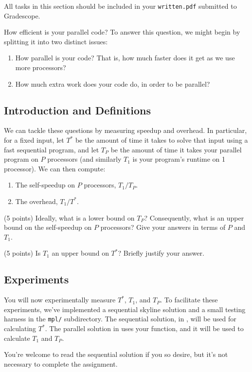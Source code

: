 \begin{note}
All tasks in this section should be included in your \texttt{written.pdf}
submitted to Gradescope.
\end{note}


How efficient is your parallel code? To answer this question, we might begin by
splitting it into two distinct issues:
%
\begin{enumerate}
\item How parallel is your code? That is, how much faster does it get as we use more processors?
\item How much extra work does your code do, in order to be parallel?
\end{enumerate}


\subsection{Introduction and Definitions}
\label{subsub:defns}

We can tackle these questions by measuring speedup and overhead. In particular,
for a fixed input, let $T^*$ be the amount of time it takes to solve that
input using a fast sequential program, and let $T_P$ be the amount of time it
takes your parallel program on $P$ processors (and similarly $T_1$ is your program's
runtime on 1 processor). We can then compute:
%
\begin{enumerate}
\item The self-speedup on $P$ processors, $T_1 / T_P$.
\item The overhead, $T_1 / T^*$.
\end{enumerate}

\begin{task}[2]
(5 points)
Ideally, what is a lower bound on $T_P$? Consequently, what is an upper bound on
the self-speedup on $P$ processors? Give your answers in terms of $P$ and $T_1$.
\end{task}

\begin{task}[3]
(5 points)
Is $T_1$ an upper bound on $T^*$? Briefly justify your answer.
\end{task}

\subsection{Experiments}

\begin{flex}

You will now experimentally measure $T^*$, $T_1$, and $T_P$. To facilitate these
experiments, we've implemented a sequential skyline solution and a small testing
harness in the \texttt{mpl/} subdirectory. The sequential solution, in
, will be used for calculating $T^*$.
The parallel solution in  uses your 
function, and it will be used to calculate $T_1$ and $T_P$.


\begin{note}
You're welcome to read the sequential solution if you so desire, but it's not
necessary to complete the assignment.
\end{note}
\end{flex}

